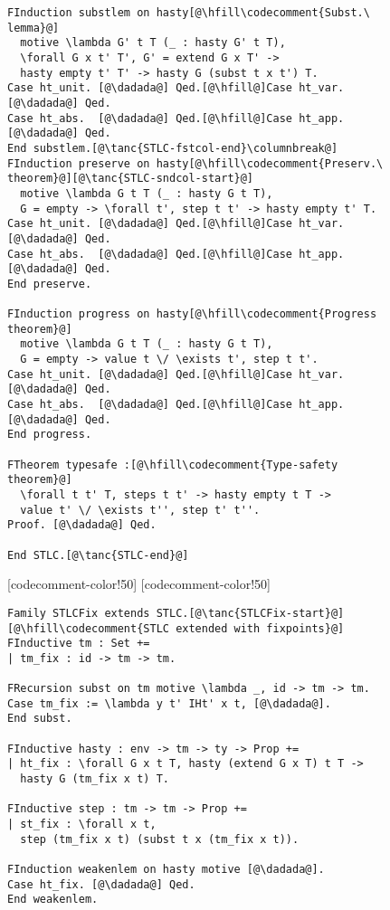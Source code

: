 \begin{figure}
\begin{minipage}{\textwidth}
\begin{multicols}{2}
\begin{lstlisting}
FInduction substlem on hasty[@\hfill\codecomment{Subst.\ lemma}@]
  motive \lambda G' t T (_ : hasty G' t T),
  \forall G x t' T', G' = extend G x T' ->
  hasty empty t' T' -> hasty G (subst t x t') T.
Case ht_unit. [@\dadada@] Qed.[@\hfill@]Case ht_var. [@\dadada@] Qed.
Case ht_abs.  [@\dadada@] Qed.[@\hfill@]Case ht_app. [@\dadada@] Qed.
End substlem.[@\tanc{STLC-fstcol-end}\columnbreak@]
FInduction preserve on hasty[@\hfill\codecomment{Preserv.\ theorem}@][@\tanc{STLC-sndcol-start}@]
  motive \lambda G t T (_ : hasty G t T),
  G = empty -> \forall t', step t t' -> hasty empty t' T.
Case ht_unit. [@\dadada@] Qed.[@\hfill@]Case ht_var. [@\dadada@] Qed.
Case ht_abs.  [@\dadada@] Qed.[@\hfill@]Case ht_app. [@\dadada@] Qed.
End preserve.

FInduction progress on hasty[@\hfill\codecomment{Progress theorem}@]
  motive \lambda G t T (_ : hasty G t T),
  G = empty -> value t \/ \exists t', step t t'.
Case ht_unit. [@\dadada@] Qed.[@\hfill@]Case ht_var. [@\dadada@] Qed.
Case ht_abs.  [@\dadada@] Qed.[@\hfill@]Case ht_app. [@\dadada@] Qed.
End progress.

FTheorem typesafe :[@\hfill\codecomment{Type-safety theorem}@]
  \forall t t' T, steps t t' -> hasty empty t T ->
  value t' \/ \exists t'', step t' t''.
Proof. [@\dadada@] Qed.

End STLC.[@\tanc{STLC-end}@]
\end{lstlisting}

[codecomment-color!50]
[codecomment-color!50]

\vspace{-8pt}


\begin{lstlisting}[firstnumber=77]
Family STLCFix extends STLC.[@\tanc{STLCFix-start}@]
[@\hfill\codecomment{STLC extended with fixpoints}@]
FInductive tm : Set +=
| tm_fix : id -> tm -> tm.

FRecursion subst on tm motive \lambda _, id -> tm -> tm.
Case tm_fix := \lambda y t' IHt' x t, [@\dadada@].
End subst.

FInductive hasty : env -> tm -> ty -> Prop +=
| ht_fix : \forall G x t T, hasty (extend G x T) t T ->
  hasty G (tm_fix x t) T.

FInductive step : tm -> tm -> Prop +=
| st_fix : \forall x t,
  step (tm_fix x t) (subst t x (tm_fix x t)).

FInduction weakenlem on hasty motive [@\dadada@].
Case ht_fix. [@\dadada@] Qed.
End weakenlem.


\end{lstlisting}
\end{multicols}
\end{minipage}
\end{figure}
